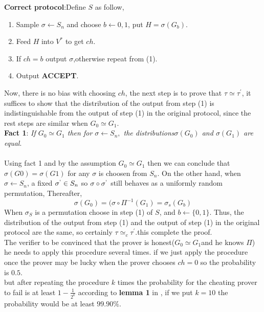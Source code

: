 \documentclass[12pt,a4paper]{article}
\begin{document}
\textbf{Correct protocol}:Define $S$ as follow,
\begin{enumerate}	
	\item
	\begin{enumerate}
		Sample $\sigma \longleftarrow S_n$ and choose $b \longleftarrow {0,1}$, put $H=\sigma(G_b)$.
	\end{enumerate}
	\item
	\begin{enumerate}
		Feed $H$ into $V^*$ to get $ch$.
	\end{enumerate}
	\item
	\begin{enumerate}
		If $ch=b$ output $\sigma$,otherwise repeat from (1).
	\end{enumerate}
	\item
	\begin{enumerate}
		Output \textbf{ACCEPT}.
	\end{enumerate}
\end{enumerate}
Now, there is no bias with choosing $ch$, the next step is to prove that $\tau \simeq \tau^{'}$, it suffices to show that the distribution of the output from step (1) is indistinguishable from the output of step (1) in the original protocol, since the rest steps are similar when $G_0 \simeq G_1$.\\

\textbf{Fact 1}: \textit{If $G_0\simeq G_1$ then for $\sigma \longleftarrow S_n,$ the distributions${\sigma(G_0)}$ and ${\sigma(G_1)}$ are equal}.\\
\\
Using fact 1 and by the assumption $G_0\simeq G_1$ then we can conclude that ${\sigma(G0)} = {\sigma(G1)}$ for any $\sigma$ is choosen from $S_n$.
On the other hand, when $\sigma \longleftarrow S_n$, a fixed $\sigma^{`}\in S_n$ so $\sigma \circ \sigma^{`}$ still behaves as a uniformly random permutation, Thereafter,\\
$${\sigma(G_0)}={(\sigma \circ \Pi^{-1}(G_1)}={\sigma_{s}(G_b)}$$
When $\sigma_{S}$ is a permutation choose in step (1) of $S$, and $b\longleftarrow\{0,1\}.$
Thus,  the distribution of the output from step (1) and the output of step (1) in the original protocol are the same, so certainly $\tau \simeq_{c} \tau^{'}$.this complete the proof.\\

The verifier to be convinced that the prover is honest($G_0 \simeq G_1 $and he knows $\Pi$) he needs to apply this procedure several times. if we just apply the procedure once the prover may be lucky when the prover chooses $ch=0$  so the probability is $0.5$.\\
but after repeating the procedure $k$ times the probability for the cheating prover to fail is at least $1-\frac{1}{2^{k}}$ according to \textbf{lemma 1} in  \cite{lec-notes2:6}, if we put $k=10$ the probability would be at least $99.90\%$.\\



 

 
\end{document}
